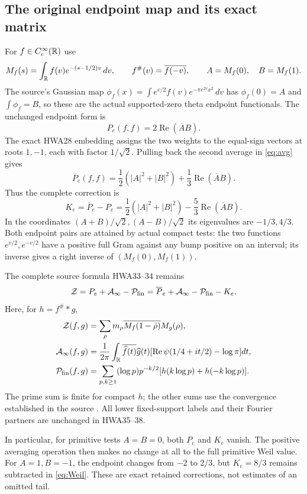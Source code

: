 \documentclass[11pt,a4paper]{article}
\theoremstyle{definition}
\begin{document}
\subsection{The original endpoint map and its exact matrix}
For $f\in C_c^\infty(\mathbb R)$ use
\[
 M_f(s)=\int_\mathbb R f(v)e^{-(s-1/2)v}\,dv,
 \qquad f^\#(v)=\overline{f(-v)},
 \qquad A=M_f(0),\quad B=M_f(1).
\]
The source's Gaussian map
$\phi_f(x)=\int e^{v/2}f(v)e^{-\pi e^{2v}x^2}\,dv$
has $\phi_f(0)=A$ and $\int\phi_f=B$, so these are the actual supported-zero theta endpoint functionals. The unchanged endpoint form is
\[
 P_e(f,f)=2\operatorname{Re}(\overline A B).
\]
The exact HWA28 embedding assigns the two weights to the equal-sign vectors at roots $1,-1$, each with factor $1/\sqrt2$. Pulling back the second average in \eqref{eq:avg} gives
\[
 \overline P_e(f,f)=\frac12(|A|^2+|B|^2)
 +\frac13\operatorname{Re}(\overline A B).
\]
Thus the complete correction is
\begin{equation}\label{eq:K}
 K_e=\overline P_e-P_e
 =\frac12(|A|^2+|B|^2)
 -\frac53\operatorname{Re}(\overline A B).
\end{equation}
In the coordinates $(A+B)/\sqrt2,(A-B)/\sqrt2$ its eigenvalues are $-1/3,4/3$.
Both endpoint pairs are attained by actual compact tests: the two functions $e^{v/2},e^{-v/2}$ have a positive full Gram against any bump positive on an interval; its inverse gives a right inverse of $(M_f(0),M_f(1))$.

The complete source formula HWA33--34 remains
\begin{equation}\label{eq:Weil}
 \mathcal Z=P_e+\mathcal A_\infty-\mathcal P_{\rm fin}
 =\overline P_e+\mathcal A_\infty-\mathcal P_{\rm fin}-K_e.
\end{equation}
Here, for $h=f^\#*g$,
\begin{align*}
 \mathcal Z(f,g)&=\sum_\rho m_\rho\overline{M_f(1-\bar\rho)}M_g(\rho),\\
 \mathcal A_\infty(f,g)&=\frac1{2\pi}\int_\mathbb R
 \overline{\widehat f(t)}\widehat g(t)
 [\operatorname{Re}\psi(1/4+it/2)-\log\pi]dt,\\
 \mathcal P_{\rm fin}(f,g)&=
 \sum_{p,k\ge1}(\log p)p^{-k/2}
 [h(k\log p)+h(-k\log p)].
\end{align*}
The prime sum is finite for compact $h$; the other sums use the convergence established in the source \citep{HWA}. All lower fixed-support labels and their Fourier partners are unchanged in HWA35--38.

In particular, for primitive tests $A=B=0$, both $P_e$ and $K_e$ vanish. The positive averaging operation then makes no change at all to the full primitive Weil value. For $A=1,B=-1$, the endpoint changes from $-2$ to $2/3$, but $K_e=8/3$ remains subtracted in \eqref{eq:Weil}. These are exact retained corrections, not estimates of an omitted tail.
\end{document}

